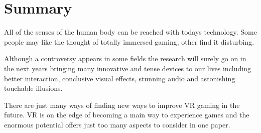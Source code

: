 \section{Summary}
All of the senses of the human body can be reached with todays technology. Some people may like the thought of totally immersed gaming, other find it disturbing.

Although a controversy appears in some fields the research will surely go on in the next years bringing many innovative and tense devices to our lives including better interaction, conclusive visual effects, stunning audio and astonishing touchable illusions. 

There are just many ways of finding new ways to improve VR gaming in the future. VR is on the edge of becoming a main way to experience games and the enormous potential offers just too many aspects to consider in one paper.

